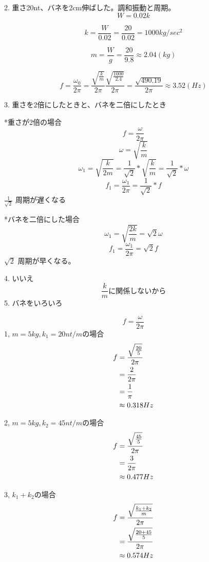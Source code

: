 \documentclass[uplatex]{jsarticle}
\begin{document}
2. 重さ20nt、バネを2cm伸ばした。調和振動と周期。
$$ W = 0.02k $$

$$ k = \frac{W}{0.02}= \frac{20}{0.02} = 1000kg/sec^2 $$

$$ m = \frac{W}{g}= \frac{20}{9.8} \approx 2.04(kg) $$

$$ f = \frac{\omega_0}{2\pi} = \frac{\sqrt{\frac{k}{m}}}{2\pi} \frac {\sqrt{\frac{1000}{2.4}}}{2\pi} = \frac{\sqrt{490.19}}{2\pi} \approx 3.52(Hz)$$


3. 重さを2倍にしたときと、バネを二倍にしたとき



*重さが2倍の場合
$$ f = \frac{\omega}{2\pi} $$
$$ \omega = \sqrt{\frac{k}{m}}$$
$$ \omega_1 =\sqrt{\frac{k}{2m}} = \frac{1}{\sqrt{2}}* \sqrt{\frac{ k}{m}}= \frac{1}{\sqrt{2}}* \omega$$
$$ f_1 = \frac{\omega_1}{2\pi}= \frac{1}{\sqrt{2}}*f $$
$ \frac{1}{\sqrt{2}}$ 周期が遅くなる



*バネを二倍にした場合
$$ \omega_1 =\sqrt{\frac{2k}{m}} = \sqrt{2} \omega$$
$$ f_1 = \frac{\omega_1}{2\pi}= \sqrt{2}f $$
$ \sqrt{2} $ 周期が早くなる。


4. いいえ
$$ \frac{k}{m} に関係しないから$$
5. バネをいろいろ

$$ f = \frac{\omega}{2\pi} $$
1, $m=5kg,k_1=20 nt/m$の場合
\begin{align}
  f &= \frac{\sqrt{\frac{20}{5}}}{2\pi} \notag \\ 
    &= \frac{2}{2\pi} \notag  \\
    &= \frac{1}{\pi} \notag \\
    &\approx {0.318}Hz \notag  \\
\end{align}

2, $m=5kg, k_2 = 45 nt/m $の場合
\begin{align}
  f &= \frac{\sqrt{\frac{45}{5}}}{2\pi} \notag \\
    &=\frac{3}{2\pi} \notag \\
    &\approx{0.477}Hz \notag 
\end{align}

3, $k_1+ k_2$の場合
\begin{align}
  f &= \frac{\sqrt{\frac{k_1+k_2}{m}}}{2\pi} \notag \\ 
    &= \frac{\sqrt{\frac{20+45}{5}}}{2\pi} \notag \\ 
    &\approx{0.574}Hz \notag 
\end{align}
\end{document}
